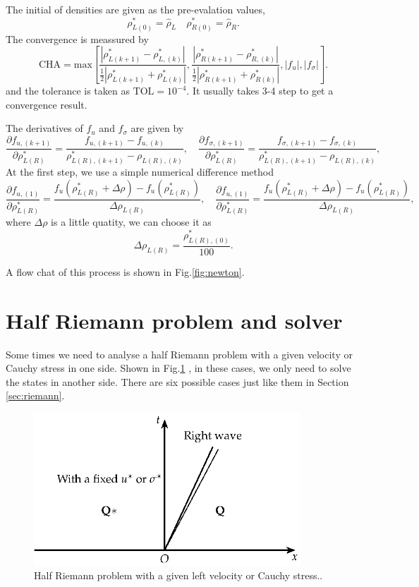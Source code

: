 \documentclass[review]{elsarticle}
\begin{document}
The initial of densities are given as the pre-evalation values,
\begin{equation}
  \rho_{L(0)}^* = \hat{\rho}_L \quad \rho_{R(0)}^* = \hat{\rho}_R.
\end{equation}
The  convergence is meassured by 
\begin{equation}
\text{CHA} = \text{max} \left[  
\frac{|\rho_{L(k+1)}^*- \rho_{L,(k)}^*|}{\frac{1}{2}|\rho_{L(k+1)}^*+\rho_{L(k)}^*|},   \frac{|\rho_{R(k+1)}^*- \rho_{R,(k)}^*|}{\frac{1}{2}|\rho_{R(k+1)}^*+\rho_{R(k)}^*|},|f_{u}|,|f_{\sigma}|\right].
\end{equation}
and the tolerance is taken as $\text{TOL} = 10^{-4}$. It usually takes 3-4 step to get a convergence result.

The derivatives of $f_{u}$ and $f_{\sigma}$ are given by
\begin{equation}
  \frac{\partial f_{u,(k+1)}}{\partial \rho^*_{L(R)}} = \frac{f_{u,(k+1)}-f_{u,(k)}}{\rho_{L(R),(k+1)}^* - \rho_{L(R),(k)}},\quad
  \frac{\partial f_{\sigma,(k+1)}}{\partial \rho^*_{L(R)}} = \frac{f_{\sigma,(k+1)}-f_{\sigma,(k)}}{\rho_{L(R),(k+1)}^* - \rho_{L(R),(k)}},
\end{equation}
At the first step, we use a simple  numerical difference  method
\begin{equation}
  \frac{\partial f_{u,(1)}}{\partial \rho^*_{L(R)}} = \frac{f_{u}(\rho^*_{L(R)}+\Delta \rho)-f_{u}(\rho^*_{L(R)})}{\Delta \rho_{L(R)}},\quad
  \frac{\partial f_{u,(1)}}{\partial \rho^*_{L(R)}} = \frac{f_{u}(\rho^*_{L(R)}+\Delta \rho)-f_{u}(\rho^*_{L(R)})}{\Delta \rho_{L(R)}},
\end{equation}
where $\Delta \rho$ is a little quatity, we can choose it as
\begin{equation}
  \Delta \rho_{L(R)} = \frac{\rho_{L(R),(0)}^*}{100}.
\end{equation}

A flow chat of this process is shown in Fig.\ref{fig:newton}.
\section{Half Riemann problem and  solver}
Some times we need to analyse a half Riemann problem with a given velocity or Cauchy stress in one side. Shown in Fig.\ref{fig:half} , in these cases, we only need to solve the states in another side. There are six possible cases just like them in Section \ref{sec:riemann}.

\begin{figure}
  \centering
  \includegraphics[width= 10cm] {Tikz-figure8.eps}
  \caption{Half Riemann problem  with a given left velocity or Cauchy stress..}
  \label{fig:half}
\end{figure}
\end{document}
